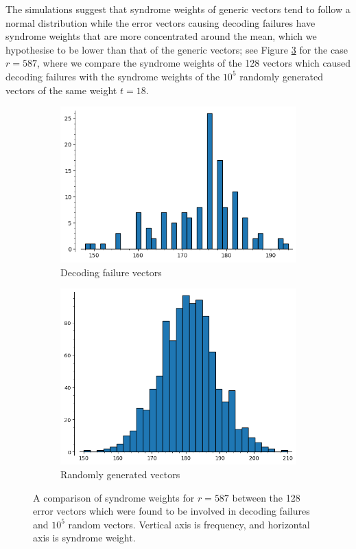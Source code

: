 The simulations suggest that syndrome weights of generic vectors tend to follow a normal distribution while the error vectors causing decoding failures have syndrome weights that are more concentrated around the mean, which we hypothesise to be lower than that of the generic vectors; see Figure \ref{fig:r87_comparison} for the case $r=587$, where we compare the syndrome weights of the  128 vectors which caused decoding failures with the syndrome weights of the $10^5$ randomly generated vectors of the same weight $t = 18$.

\begin{figure}[ht]
\centering
\begin{subfigure}[b]{.45\textwidth}
  \centering
  \includegraphics[scale=.45]{2_bike/r587df.png}
  \caption{Decoding failure vectors}
  \label{fig:r587df}
\end{subfigure}
\begin{subfigure}[b]{.45\textwidth}
  \centering
  \includegraphics[scale=.45]{2_bike/r587g_new.png}
  \caption{Randomly generated vectors}
  \label{fig:r587g}
\end{subfigure}
\caption{A comparison of syndrome weights for $r = 587$ between the 128 error vectors which were found to be involved in decoding failures and $10^5$ random vectors. Vertical axis is frequency, and horizontal axis is syndrome weight.}
\label{fig:r87_comparison}
\end{figure}

